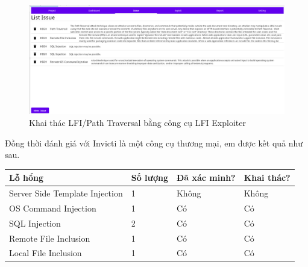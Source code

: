 \documentclass[./../main.tex]{subfiles}
\begin{document}
\begin{figure}[h!]
	\includegraphics[width=\linewidth]{./images/result_test.png}
	\caption{Khai thác LFI/Path Traversal bằng công cụ LFI Exploiter}
	\label{fig:result_test}
\end{figure}

Đồng thời đánh giá với Invicti là một công cụ thương mại, em được kết quả như sau.
\begin{table}[H]
	\begin{tabular}{|l|l|l|l|}
		\hline
		\textbf{Lỗ hổng}               & \textbf{Số lượng} & \textbf{Đã xác minh?} & \textbf{Khai thác?} \\ \hline
		Server Side Template Injection & 1                 & Không                 & Không               \\ \hline
		OS Command Injection           & 1                 & Có                    & Có                  \\ \hline
		SQL Injection                  & 2                 & Có                    & Có                  \\ \hline
		Remote File Inclusion          & 1                 & Có                    & Có                  \\ \hline
		Local File Inclusion           & 1                 & Có                    & Có                  \\ \hline
	\end{tabular}
\end{table}
\end{document}
